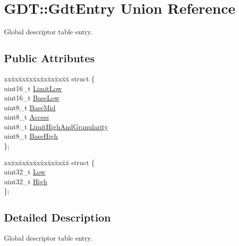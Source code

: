 \hypertarget{union_g_d_t_1_1_gdt_entry}{}\section{G\+DT\+:\+:Gdt\+Entry Union Reference}
\label{union_g_d_t_1_1_gdt_entry}


Global descriptor table entry.  


\subsection*{Public Attributes}
\begin{DoxyCompactItemize}
\item 
\begin{tabbing}
xx\=xx\=xx\=xx\=xx\=xx\=xx\=xx\=xx\=\kill
struct \{\\
\>uint16\_t \hyperlink{union_g_d_t_1_1_gdt_entry_aa14653f9f38fbb5e60a917afb5f744fc}{LimitLow}\\
\>uint16\_t \hyperlink{union_g_d_t_1_1_gdt_entry_aec057b26779c052018db45ba282a0ba1}{BaseLow}\\
\>uint8\_t \hyperlink{union_g_d_t_1_1_gdt_entry_a19107af4f815c15e0bf77344dd101b29}{BaseMid}\\
\>uint8\_t \hyperlink{union_g_d_t_1_1_gdt_entry_a9e362a6b3aad509ffc6620df7d3bca21}{Access}\\
\>uint8\_t \hyperlink{union_g_d_t_1_1_gdt_entry_a6d6f4070f4f1f45de0a52cb0d3b85fd5}{LimitHighAndGranularity}\\
\>uint8\_t \hyperlink{union_g_d_t_1_1_gdt_entry_a47143a87d7830418346a672d5cb34e94}{BaseHigh}\\
\}; \\

\end{tabbing}\item 
\begin{tabbing}
xx\=xx\=xx\=xx\=xx\=xx\=xx\=xx\=xx\=\kill
struct \{\\
\>uint32\_t \hyperlink{union_g_d_t_1_1_gdt_entry_a92c8422ad96383d5c548f8e022a99278}{Low}\\
\>uint32\_t \hyperlink{union_g_d_t_1_1_gdt_entry_a12fe18bbb192b0d1ebcb58f4e408242c}{High}\\
\}; \\

\end{tabbing}\end{DoxyCompactItemize}


\subsection{Detailed Description}
Global descriptor table entry. 

